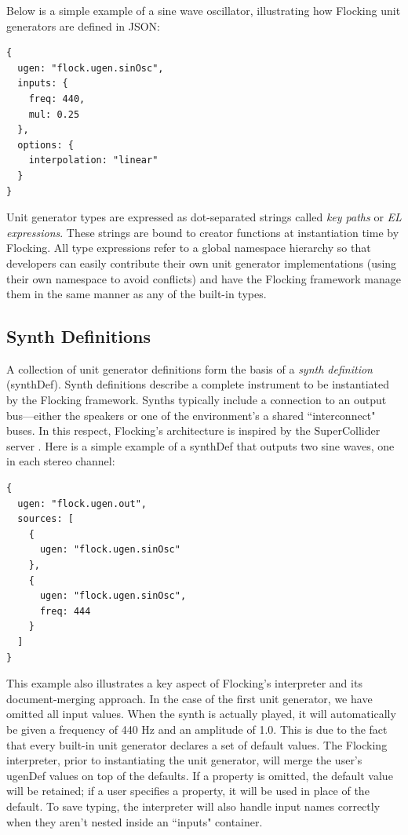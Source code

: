 \documentclass{article}
\begin{document}
Below is a simple example of a sine wave oscillator, illustrating how Flocking unit generators are defined in JSON:

\begin{verbatim}
{
  ugen: "flock.ugen.sinOsc",
  inputs: {
    freq: 440,
    mul: 0.25
  },
  options: {
    interpolation: "linear"
  }
}
\end{verbatim}

Unit generator types are expressed as dot-separated strings called {\it key paths} or {\it EL expressions}. These strings are bound to creator functions at instantiation time by Flocking. All type expressions refer to a global namespace hierarchy so that developers can easily contribute their own unit generator implementations (using their own namespace to avoid conflicts) and have the Flocking framework manage them in the same manner as any of the built-in types.

\subsection{Synth Definitions}

A collection of unit generator definitions form the basis of a {\it synth definition} (synthDef). Synth definitions describe a complete instrument to be instantiated by the Flocking framework. Synths typically include a connection to an output bus---either the speakers or one of the environment's a shared ``interconnect" buses. In this respect, Flocking's architecture is inspired by the SuperCollider server \cite[pp.25]{wilson2011supercollider}. Here is a simple example of a synthDef that outputs two sine waves, one in each stereo channel:

\begin{verbatim}
{
  ugen: "flock.ugen.out",
  sources: [
    {
      ugen: "flock.ugen.sinOsc"
    },
    {
      ugen: "flock.ugen.sinOsc",
      freq: 444
    }
  ]
}
\end{verbatim}

This example also illustrates a key aspect of Flocking's interpreter and its document-merging approach. In the case of the first unit generator, we have omitted all input values. When the synth is actually played, it will automatically be given a frequency of 440 Hz and an amplitude of 1.0. This is due to the fact that every built-in unit generator declares a set of default values. The Flocking interpreter, prior to instantiating the unit generator, will merge the user's ugenDef values on top of the defaults. If a property is omitted, the default value will be retained; if a user specifies a property, it will be used in place of the default. To save typing, the interpreter will also handle input names correctly when they aren't nested inside an ``inputs" container.
\end{document}
